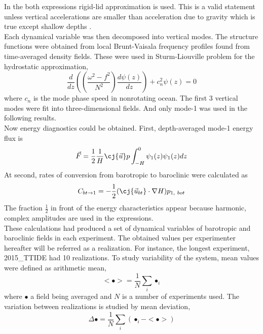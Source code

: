\documentclass[12pt]{article}
\begin{document}
In the both expressions rigid-lid approximation is used. This is a valid statement unless vertical 
accelerations are smaller than acceleration due to gravity which is true except shallow depths 
\citep{kelly2010}.\\
Each dynamical variable was then decomposed into vertical modes. The structure functions were 
obtained from local Brunt-Vaisala frequency profiles found from time-averaged density fields. 
These were used in Sturm-Liouville problem for the hydrostatic approximation,
\begin{equation}
\frac{d}{dz}((\frac{\omega^2 - f^2}{N^2} ) \frac{d \psi(z)}{dz}) + c^2_n \psi(z) = 0
\end{equation}
where $c_n$ is the mode phase speed in nonrotating ocean. The first 3 vertical modes were 
fit into three-dimensional fields. And only mode-1 was used in the following results.\\
Now energy diagnostics could be obtained. First, depth-averaged mode-1 energy flux is
\begin{equation}
\vec{F} = \frac{1}{2} \frac{1}{H} \cj{\vec{u}} p \int_{-H}^{0} \psi_1(z) \psi_1(z) dz
\end{equation}
At second, rates of conversion from barotropic to baroclinic \citep{simmons2004internal, 
kurapov2003m} were calculated as
\begin{equation}
\label{C3:eq.conv}
C_{bt\to 1} = -\frac{1}{2}(\cj{\vec{u}_{bt}} \cdot \nabla H) p_{1,~bot}
\end{equation}
The fraction $\frac{1}{2}$ in front of the energy characteristics appear because harmonic, complex 
amplitudes are used in the expressions.\\
These calculations had produced a set of dynamical variables of barotropic and baroclinic 
fields in each experiment. The obtained values per experimenter hereafter will be referred as a 
realization. For instance, the longest experiment, 2015\_TTIDE had 10 realizations. To study 
variability of the system, mean values were defined as arithmetic mean,
\begin{equation}
<\bullet> = \frac{1}{N} \sum_i \bullet_i
\end{equation}
where $\bullet$ a field being averaged and $N$ is a number of experiments used. The variation 
between realizations is studied by mean deviation,
\begin{equation}
\Delta \bullet = \frac{1}{N} \sum_i (\bullet_i - <\bullet>)
\end{equation}
\end{document}

